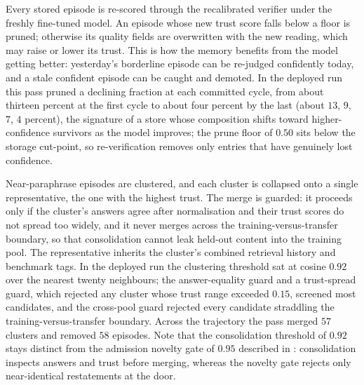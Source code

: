 \begin{description}[leftmargin=0pt, labelsep=0.5em, style=nextline]
  \item[Retroactive re-verification.] Every stored episode is re-scored through the
  recalibrated verifier under the freshly fine-tuned model. An episode whose new trust
  score falls below a floor is pruned; otherwise its quality fields are overwritten with
  the new reading, which may raise or lower its trust. This is how the memory benefits
  from the model getting better: yesterday's borderline episode can be re-judged
  confidently today, and a stale confident episode can be caught and demoted. In the
  deployed run this pass pruned a declining fraction at each committed cycle, from about
  thirteen percent at the first cycle to about four percent by the last (about $13$, $9$,
  $7$, $4$ percent), the signature of a store whose composition shifts toward
  higher-confidence survivors as the model improves; the prune floor of $0.50$ sits below
  the storage cut-point, so re-verification removes only entries that have genuinely lost
  confidence.
  \item[Consolidation.] Near-paraphrase episodes are clustered, and each cluster is
  collapsed onto a single representative, the one with the highest trust. The merge is
  guarded: it proceeds only if the cluster's answers agree after normalisation and their
  trust scores do not spread too widely, and it never merges across the
  training-versus-transfer boundary, so that consolidation cannot leak held-out content
  into the training pool. The representative inherits the cluster's combined retrieval
  history and benchmark tags. In the deployed run the clustering threshold sat at cosine
  $0.92$ over the nearest twenty neighbours; the answer-equality guard and a trust-spread
  guard, which rejected any cluster whose trust range exceeded $0.15$, screened most
  candidates, and the cross-pool guard rejected every candidate straddling the
  training-versus-transfer boundary. Across the trajectory the pass merged $57$ clusters
  and removed $58$ episodes. Note that the consolidation threshold of $0.92$ stays
  distinct from the admission novelty gate of $0.95$ described in
  : consolidation inspects answers and trust before merging,
  whereas the novelty gate rejects only near-identical restatements at the door.
\end{description}

